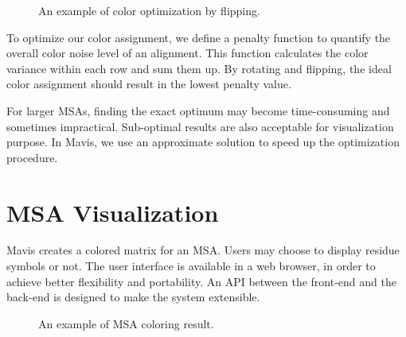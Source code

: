 \begin{figure}[hbt]
\caption[Color Optimization by Flipping]{An example of color optimization by flipping.}\label{fig:chap2_flip}
\end{figure}

To optimize our color assignment, we define a penalty function to quantify the overall color noise level of an alignment. This function calculates the color variance within each row and sum them up. By rotating and flipping, the ideal color assignment should result in the lowest penalty value.

For larger MSAs, finding the exact optimum may become time-consuming and sometimes impractical. Sub-optimal results are also acceptable for visualization purpose. In Mavis, we use an approximate solution to speed up the optimization procedure.

\section{MSA Visualization}

Mavis creates a colored matrix for an MSA. Users may choose to display residue symbols or not. The user interface is available in a web browser, in order to achieve better flexibility and portability. An API between the front-end and the back-end is designed to make the system extensible.

\begin{figure}[hbt]
\caption[Example of MSA Coloring Result]{An example of MSA coloring result.}\label{fig:chap2_msa}
\end{figure}
